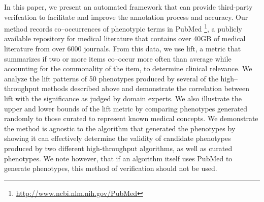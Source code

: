 \documentclass{sig-alternate-05-2015}
\begin{document}


In this paper, we present an automated framework that can provide third-party verifcation to facilitate and improve the annotation process and accuracy.
Our method records co--occurrences of phenotypic terms in PubMed \footnote{\url{http://www.ncbi.nlm.nih.gov/PubMed}}, a publicly available repository for medical literature that contains over 40GB of medical literature from over 6000 journals. 
From this data, we use lift, a metric that summarizes if two or more items co--occur more often than average while accounting for the commonality of the item, to determine clinical relevance.
We analyze the lift patterns of 50 phenotypes produced by several of the high--throughput methods described above and demonstrate the correlation between lift with the significance as judged by domain experts.
We also illustrate the upper and lower bounds of the lift metric by comparing phenotypes generated randomly to those curated to represent known medical concepts.
We demonstrate the method is agnostic to the algorithm that generated the phenotypes by showing it can effectively determine the validity of candidate phenotypes produced by two different high-throughput algorithms, as well as curated phenotypes. We note however, that if an algorithm itself uses PubMed to generate phenotypes, this method of verification should not be used.
\end{document}
